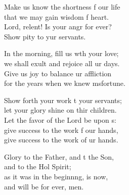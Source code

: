 \begin{psalmverse}
\begin{patverse}
Make us know the shortness f our life\Med\\
that we may gain wisdom f heart.\\
Lord, relent! Is your angr for ever?\Med\\
Show pity to yur servants.

In the morning, fill us w\pointup{\i}th your love;\Med\\
we shall exult and rejoice all ur days.\\
Give us joy to balance ur affliction\Med\\
for the years when we knew m\pointup{\i}sfortune.

Show forth your work t your servants;\Med\\
let your glory shine on thir children.\\
Let the favor of the Lord be upon s:\Flex\\
give success to the work f our hands,\Med\\
give success to the work of ur hands.

Glory to the Father, and t the Son,\Med\\
and to the Hol Spirit;\\
as it was in the beginn\pointup{\i}ng, is now,\Med\\
and will be for ever, men.
  \end{patverse}
\end{psalmverse}
